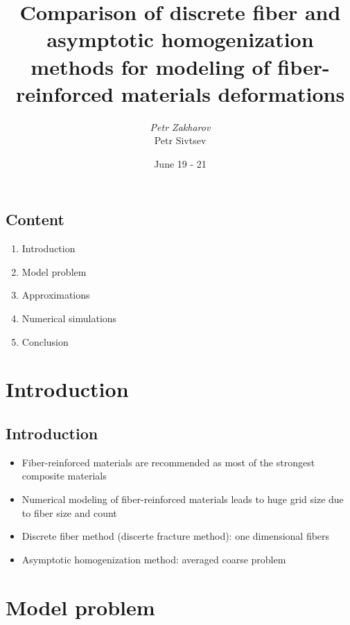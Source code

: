 \documentclass[compress,pdf,mathserif]{beamer}
\title{Comparison of discrete fiber and asymptotic homogenization methods for modeling of fiber-reinforced materials deformations}
\author{\textit{Petr Zakharov}\\Petr Sivtsev}
\institute{SCTEMM 2019}
\date{June 19 - 21}
\begin{document}
\maketitle

\subsection{Content}
\begin{frame}
\begin{enumerate}
\item Introduction
\item Model problem
\item Approximations
\item Numerical simulations
\item Conclusion
\end{enumerate}
\end{frame}

\section{Introduction}
\subsection{Introduction}
\begin{frame}
    \begin{itemize}
        \item Fiber-reinforced materials are recommended as most of the strongest composite materials
        \item Numerical modeling of fiber-reinforced materials leads to huge grid size due to fiber size and count
        \item Discrete fiber method (discerte fracture method): one dimensional fibers
        \item Asymptotic homogenization method: averaged coarse problem
    \end{itemize}
\end{frame}

\section{Model problem}
\end{document}
